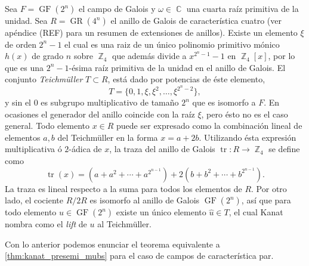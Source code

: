 \documentclass[a4paper]{report}
\DeclareMathOperator{\C}{\mathbb{C}}
\DeclareMathOperator{\Z}{\mathbb{Z}}
\DeclareMathOperator{\tr}{tr}
\DeclareMathOperator{\GF}{GF}
\DeclareMathOperator{\GR}{GR}
\begin{document}
  Sea $F = \GF(2^{n})$ el campo de Galois y $\omega \in \C$
  una cuarta raíz primitiva de la unidad. Sea $R =
  \GR(4^{n})$ el anillo de Galois de característica cuatro
  (ver apéndice (REF) para un resumen de extensiones de
  anillos). Existe un elemento $\xi$ de orden $2^{n}-1$ el
  cual es una raiz de un único polinomio primitivo mónico
  $h(x)$ de grado $n$ sobre $\Z_4$ que además divide a
  $x^{2^{n}-1} - 1$ en $\Z_4[x]$, por lo que es una
  $2^{n}-1$-ésima raíz primitiva de la unidad en el anillo
  de Galois. El conjunto \textit{Teichmüller} $T \subset R$,
  está dado por potencias de éste elemento,
  \begin{equation}
    T = \{0,1,\xi,\xi^2,\ldots,\xi^{2^{n}-2}\},
  \end{equation}
  y sin el $0$ es subgrupo multiplicativo de tamaño $2^{n}$
  que es isomorfo a $F$. En ocasiones el generador del
  anillo coincide con la raíz $\xi$, pero ésto no es el caso
  general. Todo elemento $x \in R$ puede ser expresado como
  la combinación lineal de elementos $a,b$ del Teichmüller
  en la forma $x = a + 2b$.  Utilizando ésta expresión
  multiplicativa ó $2$-ádica de $x$, la traza del anillo de
  Galois $\tr : R \to \Z_4$ se define como
  \begin{equation}
    \tr(x)
    = \left(a + a^2 + \cdots + a^{2^{n-1}}\right) + 2\left(
    b + b^2 + \cdots + b^{2^{n-1}}\right).
  \end{equation}
  La traza es lineal respecto a la suma para todos los
  elementos de $R$. Por otro lado, el cociente $R / 2R$ es
  isomorfo al anillo de Galois $\GF(2^{n})$, así que para
  todo elemento $u \in \GF(2^{n})$ existe un único elemento
  $\hat u \in T$, el cual Kanat nombra como el \textit{lift}
  de $u$ al Teichmüller. 

  Con lo anterior podemos enunciar el teorema equivalente a
  \ref{thm:kanat_presemi_mubs} para el caso de campos de
  característica par.
\end{document}

